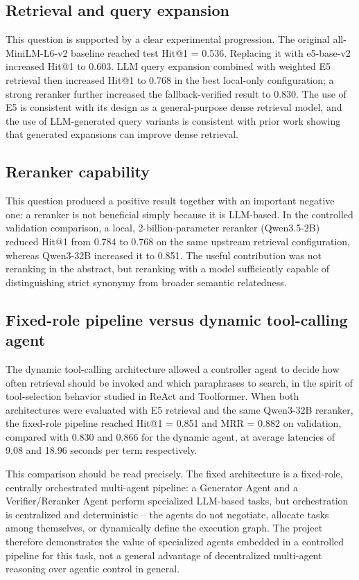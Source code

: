 \subsection{Retrieval and query expansion}

This question is supported by a clear experimental progression. The original all-MiniLM-L6-v2 baseline reached test Hit@1 = 0.536. Replacing it with e5-base-v2 increased Hit@1 to 0.603. LLM query expansion combined with weighted E5 retrieval then increased Hit@1 to 0.768 in the best local-only configuration; a strong reranker further increased the fallback-verified result to 0.830. The use of E5 is consistent with its design as a general-purpose dense retrieval model, and the use of LLM-generated query variants is consistent with prior work showing that generated expansions can improve dense retrieval.

\subsection{Reranker capability}

This question produced a positive result together with an important negative one: a reranker is not beneficial simply because it is LLM-based. In the controlled validation comparison, a local, 2-billion-parameter reranker (Qwen3.5-2B) reduced Hit@1 from 0.784 to 0.768 on the same upstream retrieval configuration, whereas Qwen3-32B increased it to 0.851. The useful contribution was not reranking in the abstract, but reranking with a model sufficiently capable of distinguishing strict synonymy from broader semantic relatedness.

\subsection{Fixed-role pipeline versus dynamic tool-calling agent}

The dynamic tool-calling architecture allowed a controller agent to decide how often retrieval should be invoked and which paraphrases to search, in the spirit of tool-selection behavior studied in ReAct and Toolformer. When both architectures were evaluated with E5 retrieval and the same Qwen3-32B reranker, the fixed-role pipeline reached Hit@1 = 0.851 and MRR = 0.882 on validation, compared with 0.830 and 0.866 for the dynamic agent, at average latencies of 9.08 and 18.96 seconds per term respectively.

This comparison should be read precisely. The fixed architecture is a fixed-role, centrally orchestrated multi-agent pipeline: a Generator Agent and a Verifier/Reranker Agent perform specialized LLM-based tasks, but orchestration is centralized and deterministic -- the agents do not negotiate, allocate tasks among themselves, or dynamically define the execution graph. The project therefore demonstrates the value of specialized agents embedded in a controlled pipeline for this task, not a general advantage of decentralized multi-agent reasoning over agentic control in general.

